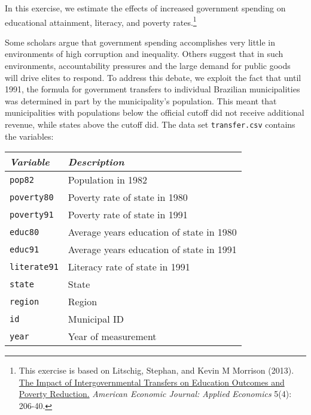 \documentclass[11pt]{article}
\begin{document}
In this exercise, we estimate the effects of increased government
spending on educational attainment, literacy, and poverty
rates.\footnote{This exercise is based on
Litschig, Stephan, and Kevin M Morrison (2013). \href{http://dx.doi.org/10.1257/app.5.4.206}{The Impact of Intergovernmental Transfers on Education Outcomes and Poverty Reduction.}\textit{ American Economic Journal: Applied Economics} 5(4): 206-40. }

Some
scholars argue that government spending accomplishes very little in
environments of high corruption and inequality. Others suggest that in
such environments, accountability pressures and the large demand for
public goods will drive elites to respond.  To address this debate, we
exploit the fact that until 1991, the formula for government transfers
to individual Brazilian municipalities was determined in part by the
municipality's population. This meant that municipalities with
populations below the official cutoff did not receive additional
revenue, while states above the cutoff did.  The data set
{\tt transfer.csv} contains the variables:


\vspace{1mm}
\begin{center}
\begin{tabular}{l p{7 cm}}
 \hline
\textit{Variable} & \textit{Description} \\
\hline
{\tt pop82}     &        Population in 1982 \\
{\tt poverty80} &         Poverty rate of state in 1980 \\
{\tt poverty91} &         Poverty rate of state in 1991 \\
{\tt educ80} &            Average years education of state in 1980 \\
{\tt educ91} &            Average years education of state in 1991 \\
{\tt literate91} &        Literacy rate of state in 1991 \\ 
{\tt state} &             State \\
{\tt region} &            Region \\
{\tt id} &                Municipal ID \\
{\tt year} &              Year of measurement \\
 \hline
\end{tabular}
\end{center} 
\end{document}
